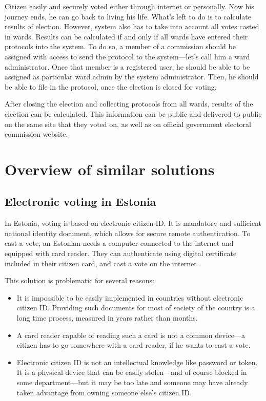\documentclass[a4paper,twoside,12pt]{book}
\begin{document}
  Citizen easily and securely voted either through internet or personally. Now his journey ends, he can go back to living his life. 
  What's left to do is to calculate results of election. However, system also has to take into account all votes casted in wards.
  Results can be calculated if and only if all wards have entered their protocols into the system.
  To do so, a member of a commission should be assigned with access to send the protocol to the system---let's call him a ward administrator. 
  Once that member is a registered user, he should be able to be assigned as particular ward admin by the system administrator.
  Then, he should be able to file in the protocol, once the election is closed for voting.
  
  After closing the election and collecting protocols from all wards, results of the election can be calculated.
  This information can be public and delivered to public on the same site that they voted on, as well as on official government electoral commission website.

\section{Overview of similar solutions}

  \subsection{Electronic voting in Estonia}
    In Estonia, voting is based on electronic citizen ID. It is mandatory and sufficient national identity document, which allows for secure remote authentication.
    To cast a vote, an Estonian needs a computer connected to the internet and equipped with card reader.
    They can authenticate using digital certificate included in their citizen card, and cast a vote on the internet \cite{bib:internet_voting_estonia}.

    This solution is problematic for several reasons:
    \begin{itemize}
      \item It is impossible to be easily implemented in countries without electronic citizen ID. 
        Providing such documents for most of society of the country is a long time process, measured in years rather than months.
      \item A card reader capable of reading such a card is not a common device---a citizen has to go somewhere with a card reader, if he wants to cast a vote.
      \item Electronic citizen ID is not an intellectual knowledge like password or token. 
        It is a physical device that can be easily stolen---and of course blocked in some department---but it may be too late and someone may have already taken advantage from owning someone else's citizen ID.
    \end{itemize}
\end{document}
